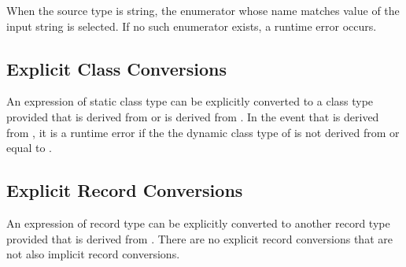 When the source type is string, the enumerator whose name matches value of the input
string is selected.  If no such enumerator exists, a runtime error occurs.

\subsection{Explicit Class Conversions}
\label{Explicit_Class_Conversions}

An expression of static class type  can be explicitly
converted to a class type  provided that  is derived
from  or  is derived from .  In the event
that  is derived from , it is a runtime error if the
the dynamic class type of  is not derived from or equal
to .

\subsection{Explicit Record Conversions}
\label{Explicit_Record_Conversions}

An expression of record type  can be explicitly converted to
another record type  provided that  is derived
from .  There are no explicit record conversions that are not
also implicit record conversions.
